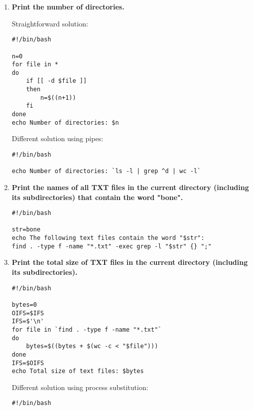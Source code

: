 \documentclass[12pt,a4paper]{article}
\begin{document}
\lstset{style=SHELL_SCRIPT}

\begin{enumerate}[label=\textbf{\arabic*}.]


\item \textbf{Print the number of directories.}

Straightforward solution:

\begin{lstlisting}
#!/bin/bash

n=0
for file in *
do
	if [[ -d $file ]]
	then
		n=$((n+1))
	fi
done
echo Number of directories: $n
\end{lstlisting}

Different solution using pipes:

\begin{lstlisting}
#!/bin/bash

echo Number of directories: `ls -l | grep ^d | wc -l`
\end{lstlisting}


\item \textbf{Print the names of all TXT files in the current directory (including its subdirectories) that contain the word "bone".}

\begin{lstlisting}
#!/bin/bash

str=bone
echo The following text files contain the word "$str":
find . -type f -name "*.txt" -exec grep -l "$str" {} ";"
\end{lstlisting}


\item \textbf{Print the total size of TXT files in the current directory (including its subdirectories).}

\begin{lstlisting}
#!/bin/bash

bytes=0
OIFS=$IFS
IFS=$'\n'
for file in `find . -type f -name "*.txt"`
do
	bytes=$((bytes + $(wc -c < "$file")))
done
IFS=$OIFS
echo Total size of text files: $bytes
\end{lstlisting}

Different solution using process substitution:

\begin{lstlisting}
#!/bin/bash


\end{lstlisting}
\end{enumerate}
\end{document}
